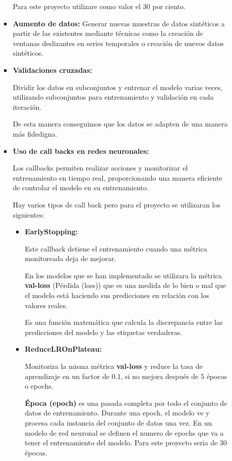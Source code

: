 \begin{enumerate}
\begin{itemize}
\begin{itemize}
	Para este proyecto utilizare como valor el 30 por ciento.
	
	\item
	\textbf{Aumento de datos:}
	Generar nuevas muestras de datos sintéticos a partir de las existentes mediante técnicas como la creación de ventanas deslizantes en series temporales o creación de nuevos datos sintéticos.
	
	\item
	\textbf{Validaciones cruzadas:}
	
	Dividir los datos en subconjuntos y entrenar el modelo varias veces, utilizando subconjuntos para entrenamiento y validación en cada iteración.
	
	De esta manera conseguimos que los datos se adapten de una manera más fidedigna.
	
	\item
	\textbf{Uso de call backs en redes neuronales:}
	
	Los callbacks permiten realizar acciones y monitorizar el entrenamiento en tiempo real, proporcionando una manera eficiente de controlar el modelo en su entrenamiento.
	
	Hay varios tipos de call back pero para el proyecto se utilizaran los siguientes:
	
		\begin{itemize}
		\item
		\textbf{EarlyStopping:}
	
	Este callback detiene el entrenamiento cuando una métrica monitoreada deja de mejorar. 
	
	En los modelos que se han implementado se utilizara la métrica \textbf{val-loss} (Pérdida (loss)) que es una medida de lo bien o mal que el modelo está haciendo sus predicciones en relación con los valores reales. 
	
	Es una función matemática que calcula la discrepancia entre las predicciones del modelo y las etiquetas verdaderas.
	
		\item
		\textbf{ReduceLROnPlateau:}	
	
	Monitoriza la misma métrica \textbf{val-loss} y reduce la tasa de aprendizaje en un factor de 0.1, si no mejora después de 5 épocas o epochs.
	
	 \textbf{Época (epoch)} es una pasada completa por todo el conjunto de datos de entrenamiento. Durante una epoch, el modelo ve y procesa cada instancia del conjunto de datos una vez. En un modelo de red neuronal se definen el numero de epochs que va a tener el entrenamiento del modelo. Para este proyecto seria de 30 épocas.
	 

\end{itemize}
\end{itemize}
\end{itemize}
\end{enumerate}
